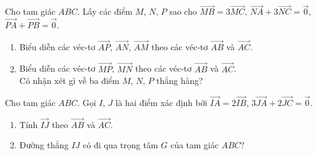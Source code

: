 \begin{bt}%
	Cho tam giác $ABC$. Lấy các điểm $M$, $N$, $P$ sao cho $\overrightarrow{MB}=3\overrightarrow{MC}$, $\overrightarrow{NA}+3\overrightarrow{NC}=\overrightarrow{0}$, $\overrightarrow{PA}+\overrightarrow{PB}=\overrightarrow{0}$.
	\begin{enumerate}
		\item Biểu diễn các véc-tơ $\overrightarrow{AP}$, $\overrightarrow{AN}$, $\overrightarrow{AM}$ theo các véc-tơ $\overrightarrow{AB}$ và $\overrightarrow{AC}$.
		\item Biểu diễn các véc-tơ $\overrightarrow{MP}$, $\overrightarrow{MN}$ theo các véc-tơ $\overrightarrow{AB}$ và $\overrightarrow{AC}$.\\
		Có nhận xét gì về ba điểm $M$, $N$, $P$ thẳng hàng?
	\end{enumerate}
\end{bt}

\begin{bt}%
	Cho tam giác $ABC$. Gọi $I$, $J$ là hai điểm xác định bởi $\overrightarrow{IA}=2\overrightarrow{IB}$, $3\overrightarrow{JA}+2\overrightarrow{JC}=\overrightarrow{0}$.
	\begin{enumerate}
		\item Tính $\overrightarrow{IJ}$ theo $\overrightarrow{AB}$ và $\overrightarrow{AC}$.
		\item Đường thẳng $IJ$ có đi qua trọng tâm $G$ của tam giác $ABC$?
	\end{enumerate}
\end{bt}

